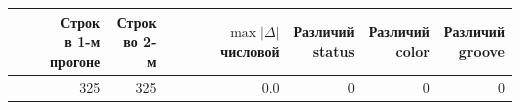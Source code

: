 \begin{tabular}{@{}rrrrrr@{}}
\toprule
\shortstack{Строк\\в 1-м прогоне} & \shortstack{Строк\\во 2-м} &
\shortstack{$\max|\Delta|$\\числовой} & \shortstack{Различий\\status} &
\shortstack{Различий\\color} & \shortstack{Различий\\groove} \\
\midrule
325 & 325 & \num{0.0} & 0 & 0 & 0 \\
\bottomrule
\end{tabular}
